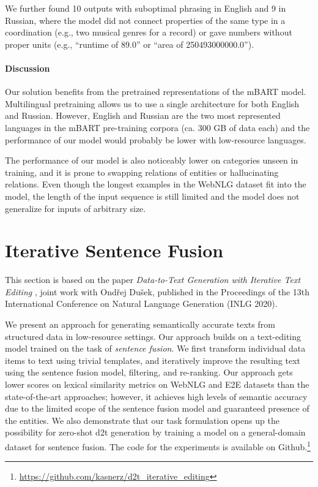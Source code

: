 We further found 10 outputs with suboptimal phrasing in English and 9 in Russian, where the model did not connect properties of the same type in a coordination (e.g., two musical genres for a record) or gave numbers without proper  units (e.g., “runtime of 89.0” or “area of 250493000000.0”).

\paragraph{Discussion}
Our solution benefits from the pretrained representations of the mBART model. Multilingual pretraining allows us to use a single architecture for both English and Russian. However, English and Russian are the two most represented languages in the mBART pre-training corpora (ca. 300 GB of data each) and the performance of our model would probably be lower with low-resource languages.

The performance of our model is also noticeably lower on categories unseen in training, and it is prone to swapping relations of entities or hallucinating relations. Even though the longest examples in the WebNLG dataset fit into the model, the length of the input sequence is still limited and the model does not generalize for inputs of arbitrary size.





\section{Iterative Sentence Fusion}
\label{sec:iterative}

\begin{refbox}
    This section is based on the paper \emph{Data-to-Text Generation with Iterative Text Editing} \cite{kasnerDatatoTextGenerationIterative2020}, joint work with Ondřej Dušek, published in the Proceedings of the 13th International Conference on Natural Language Generation (INLG 2020).
\end{refbox}

We present an approach for generating semantically accurate texts from structured data in low-resource settings. Our approach builds on a text-editing model trained on the task of \emph{sentence fusion}. We first transform individual data items to text using trivial templates, and iteratively improve the resulting text using the sentence fusion model, filtering, and re-ranking.  Our approach gets lower scores on lexical similarity metrics on WebNLG and E2E datasets than the state-of-the-art approaches; however, it achieves high levels of semantic accuracy due to the limited scope of the sentence fusion model and guaranteed presence of the entities. We also demonstrate that our task formulation opens up the possibility for zero-shot \ac{d2t} generation by training a model on a general-domain dataset for sentence fusion. The code for the experiments is available on Github.\footnote{\url{https://github.com/kasnerz/d2t_iterative_editing}}


